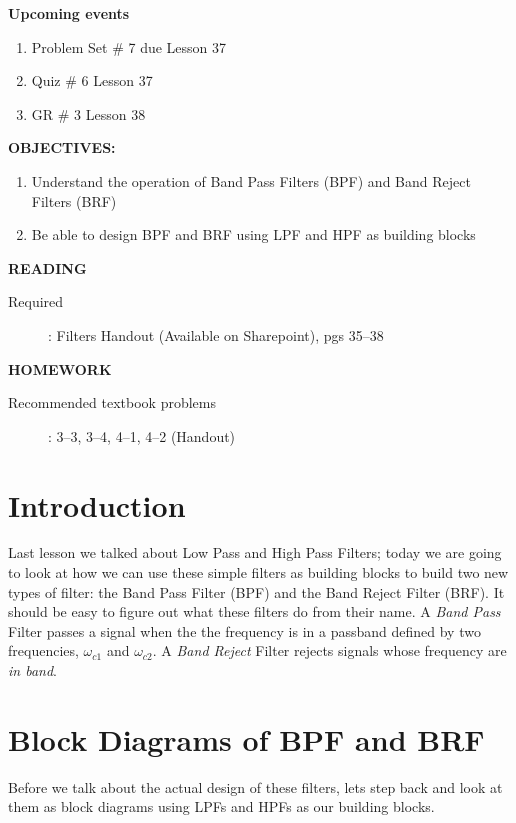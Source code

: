 \documentclass{handout}
\begin{document}
\maketitle

\textbf{Upcoming events}
\begin{enumerate}
\item Problem Set \# 7 due Lesson 37
\item Quiz \# 6 Lesson 37
\item GR \# 3 Lesson 38
\end{enumerate}

\textbf{OBJECTIVES:}
\begin{enumerate}
\item Understand the operation of Band Pass Filters (BPF) and Band Reject Filters (BRF)
\item Be able to design BPF and BRF using LPF and HPF as building blocks
\end{enumerate}

\textbf{READING}
\begin{description}
\item [Required]:
Filters Handout (Available on Sharepoint), pgs 35--38
\end{description}

\textbf{HOMEWORK}
\begin{description}
\item [Recommended textbook problems]: 3--3, 3--4, 4--1, 4--2 (Handout)
\end{description}

\section{Introduction}
Last lesson we talked about Low Pass and High Pass Filters; today we are going to look at how we can use these simple filters as building blocks to build two new types of filter: the Band Pass Filter (BPF) and the Band Reject Filter (BRF).  It should be easy to figure out what these filters do from their name.  A {\em Band Pass} Filter passes a signal when the the frequency is in a passband defined by two frequencies, $\omega_{c1}$ and $\omega_{c2}$.  A {\em Band Reject} Filter rejects signals whose frequency are {\em in band}.

\section{Block Diagrams of BPF and BRF}
Before we talk about the actual design of these filters, lets step back and look at them as block diagrams using LPFs and HPFs as our building blocks.
\end{document}
